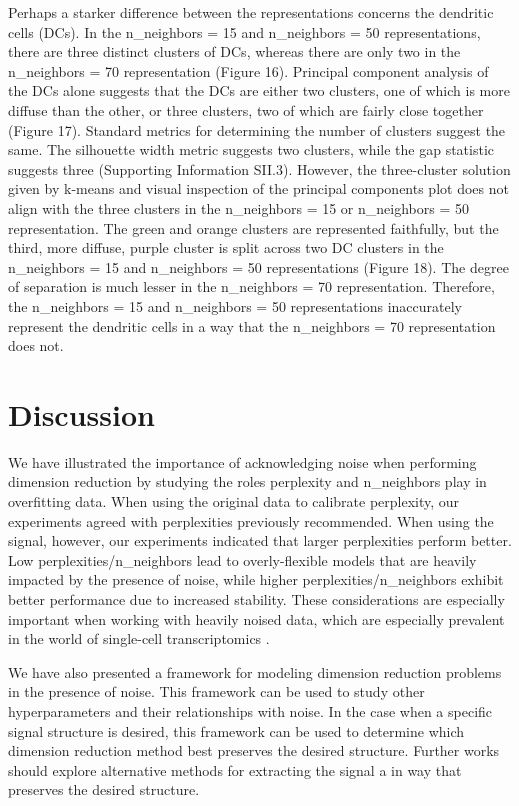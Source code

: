 \documentclass{article}
\begin{document}
Perhaps a starker difference between the representations concerns the dendritic cells (DCs). In the n\_neighbors = 15 and n\_neighbors = 50 representations, there are three distinct clusters of DCs, whereas there are only two in the n\_neighbors = 70 representation (Figure 16). Principal component analysis of the DCs alone suggests that the DCs are either two clusters, one of which is more diffuse than the other, or three clusters, two of which are fairly close together (Figure 17). Standard metrics for determining the number of clusters suggest the same. The silhouette width metric suggests two clusters, while the gap statistic suggests three (Supporting Information SII.3). However, the three-cluster solution given by k-means and visual inspection of the principal components plot does not align with the three clusters in the n\_neighbors = 15 or n\_neighbors = 50 representation. The green and orange clusters are represented faithfully, but the third, more diffuse, purple cluster is split across two DC clusters in the n\_neighbors = 15 and n\_neighbors = 50 representations (Figure 18). The degree of separation is much lesser in the n\_neighbors = 70 representation. Therefore, the n\_neighbors = 15 and n\_neighbors = 50 representations inaccurately represent the dendritic cells in a way that the n\_neighbors = 70 representation does not.

\section{Discussion}
We have illustrated the importance of acknowledging noise when performing dimension reduction by studying the roles perplexity and n\_neighbors play in overfitting data. When using the original data to calibrate perplexity, our experiments agreed with perplexities previously recommended. When using the signal, however, our experiments indicated that larger perplexities perform better. Low perplexities/n\_neighbors lead to overly-flexible models that are heavily impacted by the presence of noise, while higher perplexities/n\_neighbors exhibit better performance due to increased stability. These considerations are especially important when working with heavily noised data, which are especially prevalent in the world of single-cell transcriptomics \cite{noise in single-cell data}.

We have also presented a framework for modeling dimension reduction problems in the presence of noise. This framework can be used to study other hyperparameters and their relationships with noise. In the case when a specific signal structure is desired, this framework can be used to determine which dimension reduction method best preserves the desired structure. Further works should explore alternative methods for extracting the signal a in way that preserves the desired structure.
\end{document}
